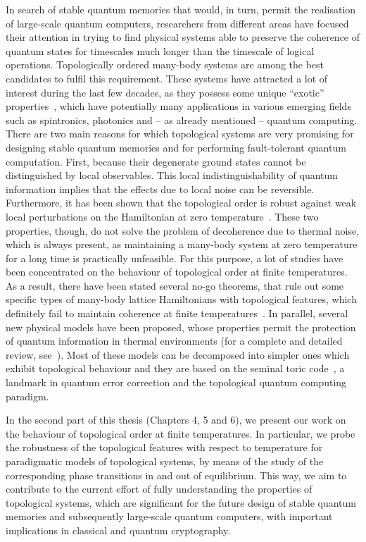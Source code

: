 In search of stable quantum memories that would, in turn, permit the realisation of large-scale quantum computers, researchers from different areas have focused their attention in trying to find physical systems able to preserve the coherence of quantum states for timescales much longer than the timescale of logical operations. Topologically ordered many-body systems are among the best candidates to fulfil this requirement.
These systems have attracted a lot of interest during the last few decades, as they possess some unique ``exotic'' properties~\cite{has:kan:10, qi:zha:11, ber:hug:13}, which have potentially many applications in various emerging fields such as spintronics, photonics and -- as already mentioned -- quantum computing. There are two main reasons for which topological systems are very promising for designing stable quantum memories and for performing fault-tolerant quantum computation. First, because their degenerate ground states cannot be distinguished by local observables. This local indistinguishability of quantum information implies that the effects due to local noise can be reversible.  Furthermore, it has been shown that the topological order is robust against weak local perturbations on the Hamiltonian at zero temperature~\cite{nay:sim:ste:fre:das:08,kit:03,bra:has:mic:10}. These two properties, though, do not solve the problem of decoherence due to thermal noise, which is always present, as maintaining a many-body system at zero temperature for a long time is practically unfeasible.
For this purpose, a lot of studies have been concentrated on the behaviour of topological order at finite temperatures. As a result, there have been stated several no-go theorems, that rule out some specific types of many-body lattice Hamiltonians with topological features, which definitely fail to maintain coherence at finite temperatures~\cite{bro:los:pac:sel:woo:16}. In parallel, several new physical models have been proposed, whose properties permit the protection of quantum information in thermal environments (for a complete and detailed review, see~\cite{bro:los:pac:sel:woo:16}). Most of these models can be decomposed into simpler ones which exhibit topological behaviour and they are based on the seminal toric code~\cite{kit:03}, a landmark in quantum error correction and the topological quantum computing paradigm.

In the second part of this thesis (Chapters 4, 5 and 6), we present our work on the behaviour of topological order at finite temperatures. In particular, we probe the robustness of the topological features with respect to temperature for paradigmatic models of topological systems, by means of the study of the corresponding phase transitions in and out of equilibrium. This way, we aim to contribute to the current effort of fully understanding the properties of topological systems, which are significant for the future design of stable quantum memories and subsequently large-scale quantum computers, with important implications in classical and quantum cryptography.
 
